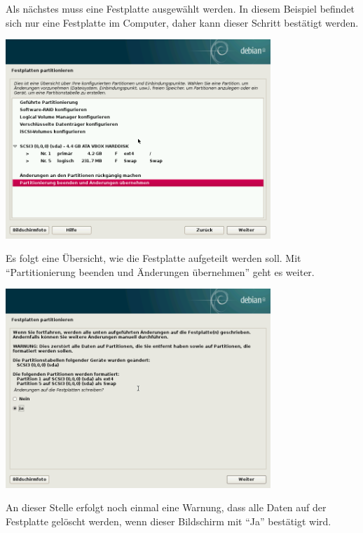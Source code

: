 \documentclass[a4paper,12pt,twoside]{article}
\begin{document}
Als nächstes muss eine Festplatte ausgewählt werden. In diesem Beispiel
befindet sich nur eine Festplatte im Computer, daher kann dieser
Schritt bestätigt werden.

\begin{minipage}{\linewidth}
    \centering
    \includegraphics[width=10cm]{screenshots/accept_partitioning.png}
    \label{fig:best_partitionierung}
\end{minipage}

Es folgt eine Übersicht, wie die Festplatte aufgeteilt werden soll. Mit
"`Partitionierung beenden und Änderungen übernehmen"' geht es weiter.

\begin{minipage}{\linewidth}
    \centering
    \includegraphics[width=10cm]{screenshots/confirm_partitioning.png}
    \label{fig:abfrage_partitionierung}
\end{minipage}

An dieser Stelle erfolgt noch einmal eine Warnung, dass alle Daten auf
der Festplatte gelöscht werden, wenn dieser Bildschirm mit
"`Ja"' bestätigt wird.
\end{document}
